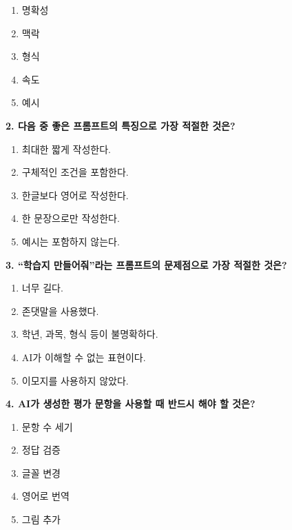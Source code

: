 \documentclass[11pt,a4paper]{article}
\begin{document}
\begin{enumerate}[label=\textcircled{\small\arabic*}]
  \item 명확성
  \item 맥락
  \item 형식
  \item 속도
  \item 예시
\end{enumerate}

\vspace{5mm}

\textbf{2. 다음 중 좋은 프롬프트의 특징으로 가장 적절한 것은?}

\begin{enumerate}[label=\textcircled{\small\arabic*}]
  \item 최대한 짧게 작성한다.
  \item 구체적인 조건을 포함한다.
  \item 한글보다 영어로 작성한다.
  \item 한 문장으로만 작성한다.
  \item 예시는 포함하지 않는다.
\end{enumerate}

\vspace{5mm}

\textbf{3. ``학습지 만들어줘''라는 프롬프트의 문제점으로 가장 적절한 것은?}

\begin{enumerate}[label=\textcircled{\small\arabic*}]
  \item 너무 길다.
  \item 존댓말을 사용했다.
  \item 학년, 과목, 형식 등이 불명확하다.
  \item AI가 이해할 수 없는 표현이다.
  \item 이모지를 사용하지 않았다.
\end{enumerate}

\vspace{5mm}

\textbf{4. AI가 생성한 평가 문항을 사용할 때 반드시 해야 할 것은?}

\begin{enumerate}[label=\textcircled{\small\arabic*}]
  \item 문항 수 세기
  \item 정답 검증
  \item 글꼴 변경
  \item 영어로 번역
  \item 그림 추가
\end{enumerate}
\end{document}
